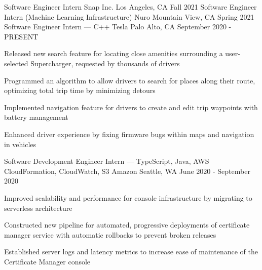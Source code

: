 \documentclass[12pt, letterpaper]{awesome-cv}
\begin{document}
\begin{cventries}
  \cventry
    {Sof\/tware Engineer Intern} %
    {Snap Inc.} %
    {Los Angeles, CA} %
    {Fall 2021} %
    {
    }
  \vspace{-0.07in}
  \cventry
    {Sof\/tware Engineer Intern (Machine Learning Infrastructure)} %
    {Nuro} %
    {Mountain View, CA} %
    {Spring 2021} %
    {
    }
  \vspace{-0.07in}
  \cventry
    {Sof\/tware Engineer Intern — C++} %
    {Tesla} %
    {Palo Alto, CA} %
    {September 2020 - PRESENT} %
    {
      \begin{cvitems} %
        \item {Released new search feature for locating close amenities surrounding a user-selected Supercharger, requested by thousands of drivers}
        \item {Programmed an algorithm to allow drivers to search for places along their route, optimizing total trip time by minimizing detours}
        \item {Implemented navigation feature for drivers to create and edit trip waypoints with battery management}
        \item {Enhanced driver experience by fixing firmware bugs within maps and navigation in vehicles}
      \end{cvitems}
    }

  \cventry
    {Sof\/tware Development Engineer Intern — TypeScript, Java, AWS CloudFormation, CloudWatch, S3} %
    {Amazon} %
    {Seattle, WA} %
    {June 2020 - September 2020} %
    {
      \begin{cvitems} %
        \item {Improved scalability and performance for console infrastructure by migrating to serverless architecture} 
        \item {Constructed new pipeline for automated, progressive deployments of certificate manager service with automatic rollbacks to prevent broken releases}
        \item {Established server logs and latency metrics to increase ease of maintenance of the Certificate Manager console}
      \end{cvitems}
    }


\end{cventries}
\end{document}
